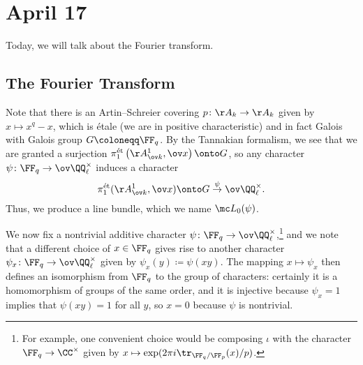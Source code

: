 \documentclass[../notes.tex]{subfiles}
\begin{document}
\section{April 17}
Today, we will talk about the Fourier transform.

\subsection{The Fourier Transform}
Note that there is an Artin--Schreier covering $p\colon\AA_k\to\AA_k$ given by $x\mapsto x^q-x$, which is \'etale (we are in positive characteristic) and in fact Galois with Galois group $G\coloneqq\FF_q$. By the Tannakian formalism, we see that we are granted a surjection $\pi_1^{\mathrm{\acute et}}\left(\AA^1_{\ov k},\ov x\right)\onto G$, so any character $\psi\colon\FF_q\to\ov\QQ_\ell^\times$ induces a character
\[\pi_1^{\mathrm{\acute et}}(\AA^1_{\ov k},\ov x)\onto G\stackrel\psi\to\ov\QQ_\ell^\times.\]
Thus, we produce a line bundle, which we name $\mc L_0(\psi)$.

We now fix a nontrivial additive character $\psi\colon\FF_q\to\ov\QQ_\ell^\times$,\footnote{For example, one convenient choice would be composing $\iota$ with the character $\FF_q\to\CC^\times$ given by $x\mapsto\exp(2\pi i\tr_{\FF_q/\FF_p}(x)/p)$.} and we note that a different choice of $x\in\FF_q$ gives rise to another character $\psi_x\colon\FF_q\to\ov\QQ_\ell^\times$ given by $\psi_x(y)\coloneqq\psi(xy)$. The mapping $x\mapsto\psi_x$ then defines an isomorphism from $\FF_q$ to the group of characters: certainly it is a homomorphism of groups of the same order, and it is injective because $\psi_x=1$ implies that $\psi(xy)=1$ for all $y$, so $x=0$ because $\psi$ is nontrivial.
\end{document}
